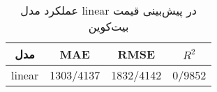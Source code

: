
        \begin{table}[H]
            \centering
            \begin{tabular}{|c|c|c|c|}
                
                \hline
                \textbf{مدل} & \textbf{MAE} & \textbf{RMSE} & \textbf{ \(R^2\) } \\
                
                \hline
                linear & 1303/4137 & 1832/4142 & 0/9852 \\

                \hline
            \end{tabular}
            \caption{عملکرد مدل linear در پیش‌بینی قیمت بیت‌کوین}
            \label{tab:linear_performance}
        \end{table}
        